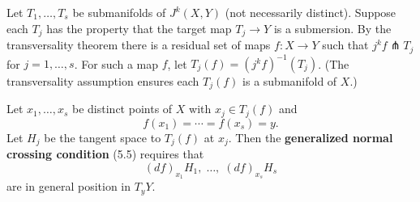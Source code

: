 Let $T_1,\ldots,T_s$ be submanifolds of $J^k(X, Y)$ (not necessarily distinct). Suppose each $T_j$ has the property that the target map $T_j \to Y$ is a submersion. By the transversality theorem there is a residual set of maps $f: X \to Y$ such that $j^k f \pitchfork T_j$ for $j = 1,\ldots,s$. For such a map $f$, let $T_j(f) = (j^k f)^{-1}(T_j)$. (The transversality assumption ensures each $T_j(f)$ is a submanifold of $X$.)

Let $x_1,\ldots,x_s$ be distinct points of $X$ with $x_j \in T_j(f)$ and
$$f(x_1) = \cdots = f(x_s) = y.$$
Let $H_j$ be the tangent space to $T_j(f)$ at $x_j$. Then the \textbf{generalized normal crossing condition} (5.5) requires that
$$(df)_{x_1}H_1,\; \ldots,\; (df)_{x_s}H_s$$
are in general position in $T_y Y$.
